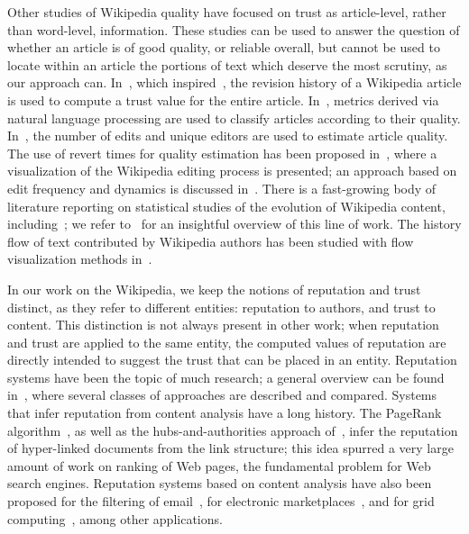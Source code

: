 Other studies of Wikipedia quality have focused on trust as
article-level, rather than word-level, information.
These studies can be used to answer the question of whether an
article is of good quality, or reliable overall, but cannot be used to
locate within an article the portions of text which deserve the most
scrutiny, as our approach can.
In~\cite{WikiTrust06}, which inspired~\cite{McGuinness06}, the
revision history of a Wikipedia article is used to compute a trust
value for the entire article.
In~\cite{Emigh05b,Mingus07}, metrics derived via natural language processing
are used to classify articles according to their quality.
In~\cite{Lih04}, the number of edits and unique editors are used to
estimate article quality.
The use of revert times for quality estimation has been proposed
in~\cite{Viegas04}, where a visualization of the Wikipedia editing
process is presented; an approach based on edit frequency and dynamics
is discussed in~\cite{WilkinsonHuberman07}.
There is a fast-growing body of literature reporting on
statistical studies of the evolution of Wikipedia content,
including~\cite{Viegas04,Voss05,Ortega07}; we refer to~\cite{Ortega07} for an
insightful overview of this line of work.
The history flow of text contributed by Wikipedia authors has
been studied with flow visualization methods in~\cite{Viegas04}.

In our work on the Wikipedia, we keep the notions of reputation and
trust distinct, as they refer to different entities: reputation to
authors, and trust to content.
This distinction is not always present in other work; when reputation
and trust are applied to the same entity, the computed values of
reputation are directly intended to suggest the trust that can be
placed in an entity.
Reputation systems have been the topic of much research; a general
overview can be found in~\cite{ResnickZFK00}, where several classes of
approaches are described and compared.
Systems that infer reputation from content analysis have a long
history.
The PageRank algorithm~\cite{PageRank98}, as well as the
hubs-and-authorities approach of~\cite{Kleinberg99}, infer the
reputation of hyper-linked documents from the link structure; this idea
spurred a very large amount of work on ranking of Web pages, the
fundamental problem for Web search engines.
Reputation systems based on content analysis have also been proposed
for the filtering of email~\cite{GolbeckEmail04}, for electronic
marketplaces~\cite{Zacharia99,YuSingh00,Wilensky06},
and for grid computing~\cite{PatelTeacyJennings05}, among other
applications.

